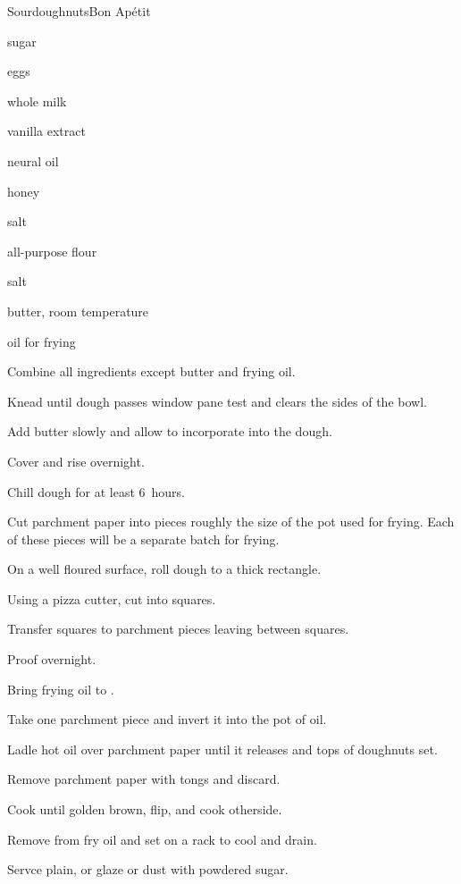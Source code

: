 \begin{recipe}{Sourdoughnuts}{Bon Ap\'etit}{}

\begin{ingredients}
\item {} sugar
\item {} eggs
\item {} whole milk
\item {} vanilla extract
\item \Tp{1\half} neural oil
\item {} honey
\item {} salt
\item {} all-purpose flour
\item {} salt
\item {} butter, room temperature
\item oil for frying
\end{ingredients}

\begin{directions}
\item Combine all ingredients except butter and frying oil.
\item Knead until dough passes window pane test and clears the sides of the bowl.
\item Add butter slowly and allow to incorporate into the dough.
\item Cover and rise overnight.
\item Chill dough for at least 6~hours.
\item Cut parchment paper into pieces roughly the size of the pot used for frying. Each of these pieces will be a separate batch for frying.
\item On a well floured surface, roll dough to a \inch{\quarter} thick rectangle.
\item Using a pizza cutter, cut into  squares.
\item Transfer squares to parchment pieces leaving  between squares.
\item Proof overnight.
\item Bring frying oil to .
\item Take one parchment piece and invert it into the pot of oil.
\item Ladle hot oil over parchment paper until it releases and tops of doughnuts set.
\item Remove parchment paper with tongs and discard.
\item Cook until golden brown, flip, and cook otherside.
\item Remove from fry oil and set on a rack to cool and drain.
\item Servce plain, or glaze or dust with powdered sugar.
\end{directions}

\end{recipe}
